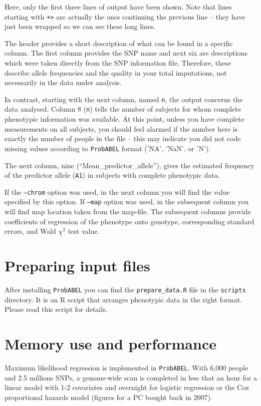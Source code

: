 \documentclass[12pt,a4paper]{article}
\newcommand{\PA}{\texttt{ProbABEL}}
\begin{document}
Here, only the first three lines of output have been shown. Note that lines
starting with \texttt{+>} are actually the ones continuing the
previous line -- they have just been wrapped so we can see
these long lines.

The header provides a short description of what can be found in a
specific column. The first column provides the SNP name and
next six are descriptions which were taken directly from the
SNP information file. Therefore, these describe allele frequencies and
the quality in your total imputations, not necessarily in the data under
analysis.

In contrast, starting with the next column, named \texttt{n},
the output concerns the data analysed. Column 8 (\texttt{n}) tells the
number of subjects for whom complete phenotypic information was
available. At this point, unless you have complete measurements on all
subjects, you should feel alarmed if the number here is exactly the
number of people in the file -- this may indicate you did not code
missing values according to \PA{} format ('NA', 'NaN', or 'N').

The next column, nine (``Mean\_predictor\_allele''), gives the estimated
frequency of the predictor allele (\texttt{A1}) in subjects with complete
phenotypic data.

If the \texttt{--chrom} option was used, in the next column you will
find the value specified by this option. If \texttt{--map} option was
used, in the subsequent column you will find map location taken from
the map-file. The subsequent columns provide coefficients of
regression of the phenotype onto genotype, corresponding standard
errors, and Wald $\chi^2$ test value.


\section{Preparing input files}
After installing \PA{} you can find the \texttt{prepare\_data.R} file
in the \texttt{scripts} directory. It is an R script that arranges
phenotypic data in the right format. Please read this script for
details.

\section{Memory use and performance}
Maximum likelihood regression is implemented in
\PA{}. With 6,000 people and 2.5 millions SNPs, a
genome-wide scan is completed in less that an hour for a linear model
with 1-2 covariates and overnight for logistic regression or the Cox
proportional hazards model (figures for a PC bought back in 2007).
\end{document}
